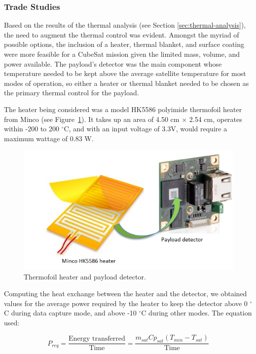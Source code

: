 \documentclass[12pt]{article}
\begin{document}
\subsubsection{Trade Studies}

Based on the results of the thermal analysis (see Section \ref{sec:thermal-analysis}), the need to augment the thermal control was evident. Amongst the myriad of possible options, the inclusion of a heater, thermal blanket, and surface coating were more feasible for a CubeSat mission given the limited mass, volume, and power available. The payload’s detector was the main component whose temperature needed to be kept above the average satellite temperature for most modes of operation, so either a heater or thermal blanket needed to be chosen as the primary thermal control for the payload.

The heater being considered was a model HK5586 polyimide thermofoil heater from Minco (see Figure~\ref{fig:thermal-heater}). It takes up an area of 4.50 cm $\times$ 2.54 cm, operates within -200 to 200 $^\circ$C, and with an input voltage of 3.3V, would require a maximum wattage of 0.83 W. 

\begin{figure}[ht]%
\centering
\includegraphics{images/thermal-heater}%
\caption{Thermofoil heater and payload detector.\cite{minco,ids-imaging}}%
\label{fig:thermal-heater}%
\end{figure}

Computing the heat exchange between the heater and the detector, we obtained values for the average power required by the heater to keep the detector above 0 $^\circ$C during data capture mode, and above -10 $^\circ$C during other modes. The equation used:

\begin{equation}
P_{req} = \frac{\text{Energy transferred}}{\text{Time}} = \frac{m_{sat} Cp_{sat} (T_{min} - T_{sat})}{\text{Time}}
\label{eq:thermal-power-required}
\end{equation}
\end{document}
